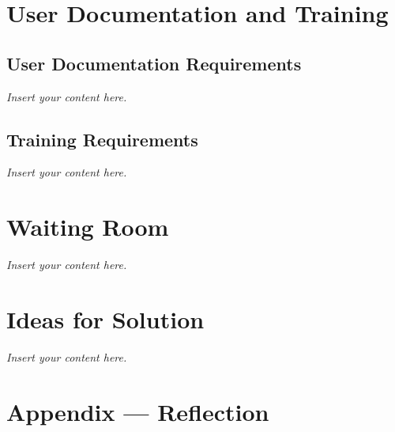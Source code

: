 \documentclass[12pt]{article}
\newcommand{\lips}{\textit{Insert your content here.}}
\begin{document}
\section{User Documentation and Training}
\subsection{User Documentation Requirements}
\lips
\subsection{Training Requirements}
\lips

\section{Waiting Room}
\lips

\section{Ideas for Solution}
\lips

\newpage{}
\section*{Appendix --- Reflection}




\end{document}
